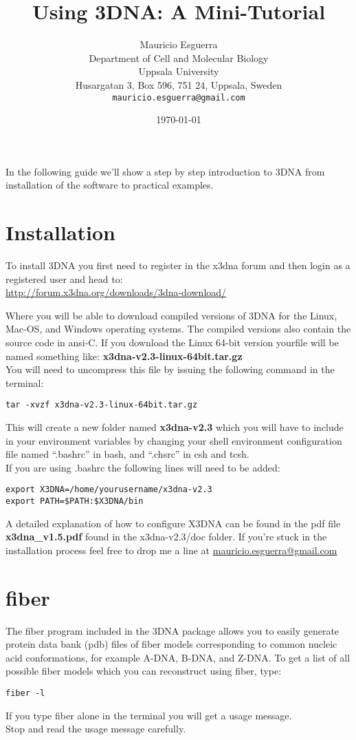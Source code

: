 \documentclass[10pt, oneside, pdftex]{article}
\title{Using 3DNA: A Mini-Tutorial}
\author{Mauricio Esguerra\\
\small  Department of Cell and Molecular Biology\\[-0.8ex]
\small  Uppsala University\\[-0.8ex]
\small  Husargatan 3, Box 596, 751 24, Uppsala, Sweden\\[-0.8ex]
\small  \texttt{mauricio.esguerra@gmail.com}}
\date{\today}
\begin{document}
\maketitle
\tableofcontents

\label{basics}
In the following guide we'll show  a step by step introduction to 3DNA
from installation of the software to practical examples.

\section{Installation}
To install 3DNA you first need to register in the x3dna forum and then
login as a registered user and head to:\\
\url{http://forum.x3dna.org/downloads/3dna-download/}

\noindent Where you will be able to download compiled versions of 3DNA
for the Linux, Mac-OS, and Windows operating systems. The compiled
versions also contain the source code in ansi-C.
If  you download  the  Linux  64-bit version  yourfile  will be  named
something like:
\textbf{x3dna-v2.3-linux-64bit.tar.gz}\\

You will need to uncompress this file by issuing the following command
in the terminal:
\begin{Verbatim}
tar -xvzf x3dna-v2.3-linux-64bit.tar.gz
\end{Verbatim}
This will create a new folder named \textbf{x3dna-v2.3} which you will
have to include  in your environment variables by  changing your shell
environment  configuration   file  named  ``.bashrc''  in   bash,  and
``.chsrc'' in csh  and tcsh.\\ If you are using  .bashrc the following
lines will need to be added:
\begin{Verbatim}
export X3DNA=/home/yourusername/x3dna-v2.3
export PATH=$PATH:$X3DNA/bin
\end{Verbatim}
A detailed explanation  of how to configure X3DNA can  be found in the
pdf   file  \textbf{x3dna\_v1.5.pdf}   found  in   the  x3dna-v2.3/doc
folder. If you're stuck in the  installation process feel free to drop
me a line at \url{mauricio.esguerra@gmail.com}

\section{fiber}
The \textrm{fiber} program included in  the 3DNA package allows you to
easily  generate  protein  data  bank  (pdb)  files  of  fiber  models
corresponding to common nucleic acid conformations, for example A-DNA,
B-DNA, and  Z-DNA.  To get a  list of all possible  fiber models which
you can reconstruct using \textrm{fiber}, type:
\begin{Verbatim}
fiber -l
\end{Verbatim}
If you type \textrm{fiber} alone in the terminal you will get a usage
message.\\
Stop and read the usage message carefully.\\
\end{document}
